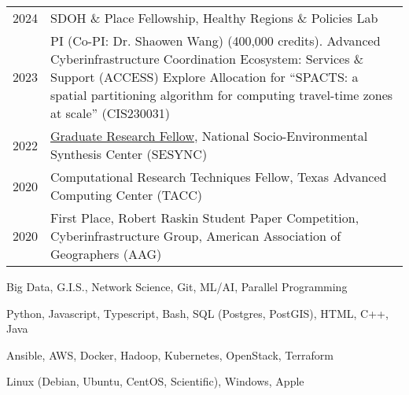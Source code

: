 \documentclass{acmresume}
\begin{document}
        \begin{longtable}{p{0.08\linewidth} p{0.92\linewidth}}
            
            2024 & SDOH \& Place Fellowship, Healthy Regions \& Policies Lab \\
        
            2023 & PI (Co-PI: Dr. Shaowen Wang) (400,000 credits). Advanced Cyberinfrastructure Coordination Ecosystem: Services \& Support (ACCESS) Explore Allocation for “SPACTS: a spatial partitioning algorithm for computing travel-time zones at scale” (CIS230031) \\

    
                    
            2022 & \href{https://www.sesync.org/project/graduate-pursuits-request-for-proposals/financial-opacity-and-challenges-to-forest}{Graduate Research Fellow}, National Socio-Environmental Synthesis Center (SESYNC)\\
    
            2020 & Computational Research Techniques Fellow, Texas Advanced Computing Center (TACC)\\
    
            2020 & First Place, Robert Raskin Student Paper Competition, Cyberinfrastructure Group, American Association of Geographers (AAG) \\
    
        \end{longtable}
    
    
\vspace*{-.25cm}

        \begin{description}[topsep=0pt,itemsep=0pt]
        	 Big Data, G.I.S., Network Science, Git, ML/AI, Parallel Programming
        	
        	\desc[Languages:] Python, Javascript, Typescript, Bash, SQL (Postgres, PostGIS), HTML, C++, Java
        	
        	\desc[Technologies:] Ansible, AWS, Docker, Hadoop, Kubernetes, OpenStack, Terraform
        	
        	 Linux (Debian, Ubuntu, CentOS, Scientific), Windows, Apple
        \end{description}

	
\end{document}
